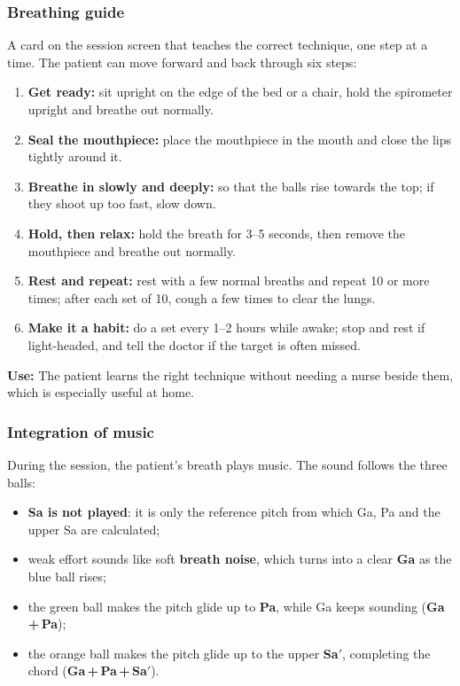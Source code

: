 \documentclass[12pt,a4paper]{article}
\newcommand{\Sah}{Sa\ensuremath{'}}     %
\begin{document}
\subsubsection{Breathing guide}
A card on the session screen that teaches the correct technique, one step at a time. The patient can move forward and back through six steps:
\begin{enumerate}
  \item \textbf{Get ready:} sit upright on the edge of the bed or a chair, hold the spirometer upright and breathe out normally.
  \item \textbf{Seal the mouthpiece:} place the mouthpiece in the mouth and close the lips tightly around it.
  \item \textbf{Breathe in slowly and deeply:} so that the balls rise towards the top; if they shoot up too fast, slow down.
  \item \textbf{Hold, then relax:} hold the breath for 3--5 seconds, then remove the mouthpiece and breathe out normally.
  \item \textbf{Rest and repeat:} rest with a few normal breaths and repeat 10 or more times; after each set of 10, cough a few times to clear the lungs.
  \item \textbf{Make it a habit:} do a set every 1--2 hours while awake; stop and rest if light-headed, and tell the doctor if the target is often missed.
\end{enumerate}

\textbf{Use:} The patient learns the right technique without needing a nurse beside them, which is especially useful at home.

\subsubsection{Integration of music}
During the session, the patient's breath plays music. The sound follows the three balls:
\begin{itemize}
  \item \textbf{Sa is not played}: it is only the reference pitch from which Ga, Pa and the upper Sa are calculated;
  \item weak effort sounds like soft \textbf{breath noise}, which turns into a clear \textbf{Ga} as the blue ball rises;
  \item the green ball makes the pitch glide up to \textbf{Pa}, while Ga keeps sounding (\textbf{Ga\,+\,Pa});
  \item the orange ball makes the pitch glide up to the upper \textbf{\Sah}, completing the chord (\textbf{Ga\,+\,Pa\,+\,\Sah}).
\end{itemize}
\end{document}
